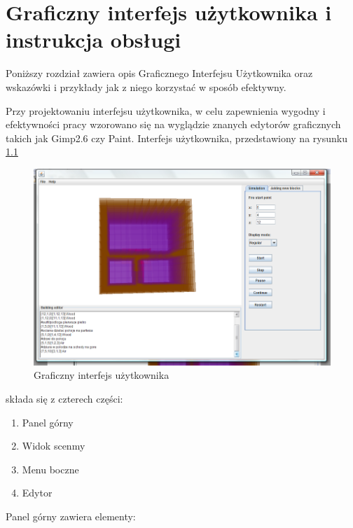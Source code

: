 ﻿\chapter {Graficzny interfejs użytkownika i instrukcja obsługi}
\label{cha:gui}
Poniższy rozdział zawiera opis Graficznego Interfejsu Użytkownika oraz wskazówki i przykłady jak z niego korzystać
w sposób efektywny.


Przy projektowaniu interfejsu użytkownika, w celu zapewnienia wygodny i efektywności pracy wzorowano się na wyglądzie
znanych edytorów graficznych takich jak Gimp2.6 czy Paint.
Interfejs użytkownika, przedstawiony na rysunku \ref{gui_cale} 
\begin{figure}
\begin{center}
\includegraphics{gui_cale.png} 
\caption { Graficzny interfejs użytkownika}
\label {gui_cale}
\end{center}
\end{figure}
składa się  z czterech części:
\begin {enumerate}
\item Panel górny
\item Widok scenmy
\item Menu boczne
\item Edytor
\end {enumerate}
Panel górny zawiera elementy:
